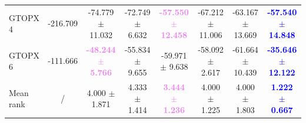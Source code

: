 \begin{table}[t!]
{\begin{tabular}{l|c|c|c|cccc}
GTOPX 4 & -216.709 & -74.779 $\pm$ 11.032 & -72.749 $\pm$ 6.632 & \textbf{\textcolor{violet}{-57.550 $\pm$ 12.458}} & -67.212 $\pm$ 11.006 & -63.167 $\pm$ 13.669 & \textbf{\textcolor{blue}{-57.540 $\pm$ 14.848}} \\
GTOPX 6 & -111.666 & \textbf{\textcolor{violet}{-48.244 $\pm$ 5.766}} & -55.834 $\pm$ 9.655 & -59.971 $\pm$ 9.638 & -58.092 $\pm$ 2.617 & -61.664 $\pm$ 10.439 & \textbf{\textcolor{blue}{-35.646 $\pm$ 12.122}} \\
\midrule
Mean rank & / & 4.000 $\pm$ 1.871 & 4.333 $\pm$ 1.414 & \textbf{\textcolor{violet}{3.444 $\pm$ 1.236}} & 4.000 $\pm$ 1.225 & 4.000 $\pm$ 1.803 & \textbf{\textcolor{blue}{1.222 $\pm$ 0.667}} \\
\bottomrule
\end{tabular}
}
\label{tab:gtg-duo-eval}
\end{table}

